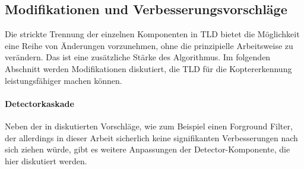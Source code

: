 
\subsection{Modifikationen und Verbesserungsvorschläge}
	Die strickte Trennung der einzelnen Komponenten in TLD bietet die Möglichkeit eine Reihe von Änderungen vorzunehmen, ohne die prinzipielle Arbeitsweise zu verändern. Das ist eine zusätzliche Stärke des Algorithmus. Im folgenden Abschnitt werden Modifikationen diskutiert, die TLD für die Koptererkennung leistungsfähiger machen können.

	\paragraph{Detectorkaskade}
	Neben der in \cite{TLD} diskutierten Vorschläge, wie zum Beispiel einen Forground Filter, der allerdings in dieser Arbeit sicherlich keine signifikanten Verbesserungen nach sich ziehen würde, gibt es weitere Anpassungen der Detector-Komponente, die hier diskutiert werden.


